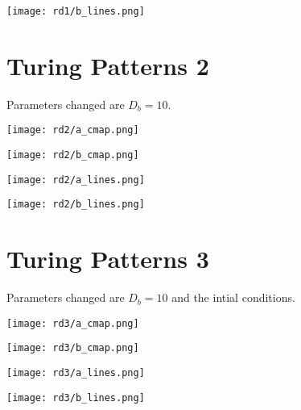 \documentclass{article}
\begin{document}
\begin{center}
    \texttt{[image: rd1/b\_lines.png]}
\end{center}

\section*{Turing Patterns 2}

Parameters changed are $D_b = 10$.

\begin{center}
    \texttt{[image: rd2/a\_cmap.png]}
\end{center}

\begin{center}
    \texttt{[image: rd2/b\_cmap.png]}
\end{center}

\begin{center}
    \texttt{[image: rd2/a\_lines.png]}
\end{center}

\begin{center}
    \texttt{[image: rd2/b\_lines.png]}
\end{center}

\section*{Turing Patterns 3}

Parameters changed are $D_b = 10$ and the intial conditions.

\begin{center}
    \texttt{[image: rd3/a\_cmap.png]}
\end{center}

\begin{center}
    \texttt{[image: rd3/b\_cmap.png]}
\end{center}

\begin{center}
    \texttt{[image: rd3/a\_lines.png]}
\end{center}

\begin{center}
    \texttt{[image: rd3/b\_lines.png]}
\end{center}
\end{document}
